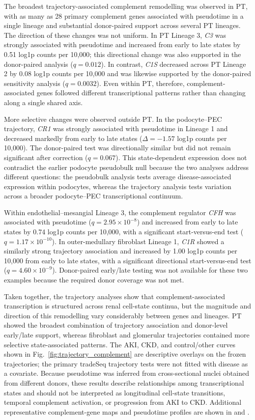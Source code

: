 \documentclass[10pt,letterpaper]{article}
\begin{document}
The broadest trajectory-associated complement remodelling was observed in PT, with as many as 28 primary complement genes associated with pseudotime in a single lineage and substantial donor-paired support across several PT lineages. The direction of these changes was not uniform. In PT Lineage 3, \textit{C3} was strongly associated with pseudotime and increased from early to late states by 0.51 log1p counts per 10,000; this directional change was also supported in the donor-paired analysis ($q=0.012$). In contrast, \textit{C1S} decreased across PT Lineage 2 by 0.08 log1p counts per 10,000 and was likewise supported by the donor-paired sensitivity analysis ($q=0.0032$). Even within PT, therefore, complement-associated genes followed different transcriptional patterns rather than changing along a single shared axis.

More selective changes were observed outside PT. In the podocyte--PEC trajectory, \textit{CR1} was strongly associated with pseudotime in Lineage 1 and decreased markedly from early to late states ($\Delta=-1.57$ log1p counts per 10,000). The donor-paired test was directionally similar but did not remain significant after correction ($q=0.067$). This state-dependent expression does not contradict the earlier podocyte pseudobulk null because the two analyses address different questions: the pseudobulk analysis tests average disease-associated expression within podocytes, whereas the trajectory analysis tests variation across a broader podocyte--PEC transcriptional continuum.

Within endothelial--mesangial Lineage 3, the complement regulator \textit{CFH} was associated with pseudotime ($q=2.95\times10^{-8}$) and increased from early to late states by 0.74 log1p counts per 10,000, with a significant start-versus-end test ($q=1.17\times10^{-10}$). In outer-medullary fibroblast Lineage 1, \textit{C1R} showed a similarly strong trajectory association and increased by 1.00 log1p counts per 10,000 from early to late states, with a significant directional start-versus-end test ($q=4.60\times10^{-9}$). Donor-paired early/late testing was not available for these two examples because the required donor coverage was not met.

Taken together, the trajectory analyses show that complement-associated transcription is structured across renal cell-state continua, but the magnitude and direction of this remodelling vary considerably between genes and lineages. PT showed the broadest combination of trajectory association and donor-level early/late support, whereas fibroblast and glomerular trajectories contained more selective state-associated patterns. The AKI, CKD, and control/other curves shown in Fig.~\ref{fig:trajectory_complement} are descriptive overlays on the frozen trajectories; the primary tradeSeq trajectory tests were not fitted with disease as a covariate. Because pseudotime was inferred from cross-sectional nuclei obtained from different donors, these results describe relationships among transcriptional states and should not be interpreted as longitudinal cell-state transitions, temporal complement activation, or progression from AKI to CKD. Additional representative complement-gene maps and pseudotime profiles are shown in  and .
\end{document}

